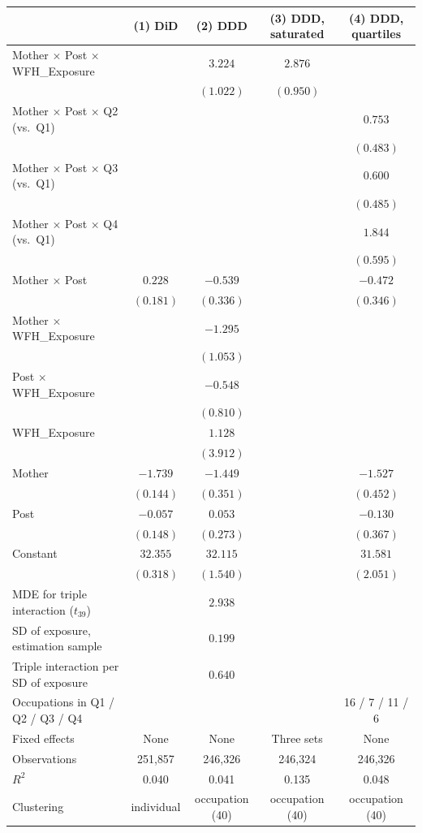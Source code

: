 \begin{tabular}{lcccc}
\toprule
 & (1) DiD & (2) DDD & (3) DDD, saturated & (4) DDD, quartiles \\
\midrule
Mother $\times$ Post $\times$ WFH\_Exposure &  & $3.224$\sym{**} & $2.876$\sym{**} &  \\
 &  & $(1.022)$ & $(0.950)$ &  \\
Mother $\times$ Post $\times$ Q2 (vs.\ Q1) &  &  &  & $0.753$ \\
 &  &  &  & $(0.483)$ \\
Mother $\times$ Post $\times$ Q3 (vs.\ Q1) &  &  &  & $0.600$ \\
 &  &  &  & $(0.485)$ \\
Mother $\times$ Post $\times$ Q4 (vs.\ Q1) &  &  &  & $1.844$\sym{**} \\
 &  &  &  & $(0.595)$ \\
Mother $\times$ Post & $0.228$ & $-0.539$ &  & $-0.472$ \\
 & $(0.181)$ & $(0.336)$ &  & $(0.346)$ \\
Mother $\times$ WFH\_Exposure &  & $-1.295$ &  &  \\
 &  & $(1.053)$ &  &  \\
Post $\times$ WFH\_Exposure &  & $-0.548$ &  &  \\
 &  & $(0.810)$ &  &  \\
WFH\_Exposure &  & $1.128$ &  &  \\
 &  & $(3.912)$ &  &  \\
Mother & $-1.739$\sym{***} & $-1.449$\sym{***} &  & $-1.527$\sym{**} \\
 & $(0.144)$ & $(0.351)$ &  & $(0.452)$ \\
Post & $-0.057$ & $0.053$ &  & $-0.130$ \\
 & $(0.148)$ & $(0.273)$ &  & $(0.367)$ \\
Constant & $32.355$\sym{***} & $32.115$\sym{***} &  & $31.581$\sym{***} \\
 & $(0.318)$ & $(1.540)$ &  & $(2.051)$ \\
\midrule
MDE for triple interaction ($t_{39}$) &  & $2.938$ &  &  \\
SD of exposure, estimation sample &  & $0.199$ &  &  \\
Triple interaction per SD of exposure &  & $0.640$ &  &  \\
Occupations in Q1 / Q2 / Q3 / Q4 &  &  &  & 16 / 7 / 11 / 6 \\
Fixed effects & None & None & Three sets & None \\
Observations & 251{,}857 & 246{,}326 & 246{,}324 & 246{,}326 \\
$R^2$ & 0.040 & 0.041 & 0.135 & 0.048 \\
Clustering & individual & occupation (40) & occupation (40) & occupation (40) \\
\bottomrule
\end{tabular}
